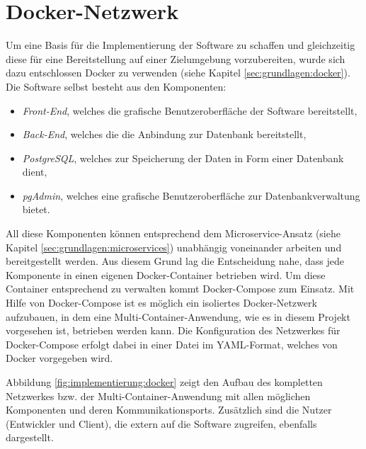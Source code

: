 \section{Docker-Netzwerk}

Um eine Basis für die Implementierung der Software zu schaffen und gleichzeitig diese für eine Bereitstellung auf einer Zielumgebung vorzubereiten, wurde sich dazu entschlossen Docker zu verwenden (siehe Kapitel \ref{sec:grundlagen:docker}). 
Die Software selbst besteht aus den Komponenten:
\begin{itemize}
	\item \emph{Front-End}, welches die grafische Benutzeroberfläche der Software bereitstellt,
	\item \emph{Back-End}, welches die die Anbindung zur Datenbank bereitstellt,
	\item \emph{PostgreSQL}, welches zur Speicherung der Daten in Form einer Datenbank dient,
	\item \emph{pgAdmin}, welches eine grafische Benutzeroberfläche zur Datenbankverwaltung bietet.
\end{itemize}

All diese Komponenten können entsprechend dem Microservice-Ansatz (siehe Kapitel \ref{sec:grundlagen:microservices}) unabhängig voneinander arbeiten und bereitgestellt werden. 
Aus diesem Grund lag die Entscheidung nahe, dass jede Komponente in einen eigenen Docker-Container betrieben wird.
Um diese Container entsprechend zu verwalten kommt Docker-Compose zum Einsatz.
Mit Hilfe von Docker-Compose ist es möglich ein isoliertes Docker-Netzwerk aufzubauen, in dem eine Multi-Container-Anwendung, wie es in diesem Projekt vorgesehen ist, betrieben werden kann.
Die Konfiguration des Netzwerkes für Docker-Compose erfolgt dabei in einer Datei im YAML-Format, welches von Docker vorgegeben wird.

Abbildung \ref{fig:implementierung:docker} zeigt den Aufbau des kompletten Netzwerkes bzw. der Multi-Container-Anwendung mit allen möglichen Komponenten und deren Kommunikationsports. 
Zusätzlich sind die Nutzer (Entwickler und Client), die extern auf die Software zugreifen, ebenfalls dargestellt.

